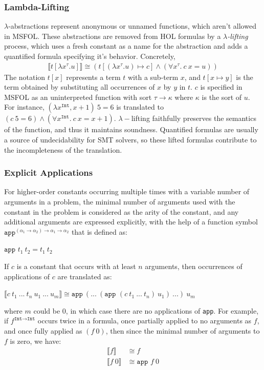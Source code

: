 \documentclass[11pt]{article}
\begin{document}
	\subsubsection{Lambda-Lifting}
	$\lambda$-abstractions represent 
	anonymous or unnamed functions, 
	which aren't allowed in MSFOL.
	These abstractions are removed
	from HOL formulas by a 
	\textit{$\lambda$-lifting} process,
	which uses a fresh constant as a
	name for the abstraction and adds 
	a quantified formula specifying 
	it's behavior. Concretely,
	\begin{align*}
	\llbracket t[\lambda x^{\tau}.u]
	\rrbracket \cong 
	(t[(\lambda x^{\tau}.u) \mapsto c]
	\land (\forall x^{\tau}.\ c\ x = u))
	\end{align*}
	The notation $t[x]$ represents a 
	term $t$ with a sub-term $x$, 
	and $t[x \mapsto y]$ is the 
	term obtained by substituting all 
	occurrences of $x$ by $y$ in $t$.
	$c$ is specified in MSFOL as an 
	uninterpreted function with sort 
	$\tau \to \kappa$ where $\kappa$ 
	is the sort of $u$. For instance, 
	$(\lambda x^{\texttt{Int}}, x + 1)\ 
	5 = 6$
	is translated to $(c\ 5 = 6) \land
	(\forall x^{\texttt{Int}}.\ 
	c\ x = x + 1)$. $\lambda-$lifting
	faithfully preserves the 
	semantics of the function, and 
	thus it maintains soundness. 
	Quantified formulas are usually a 
	source of undecidability for SMT 
	solvers, so these lifted formulas 
	contribute to the incompleteness
	of the translation.
	
	\subsubsection{Explicit Applications}
	For higher-order constants 
	occurring multiple times with 
	a variable number 
	of arguments in a problem, 
	the minimal number of arguments 
	used with the constant in the 
	problem is considered as the arity 
	of the constant, and any additional 
	arguments are expressed 
	explicitly, with the help of a 
	function symbol 
	$\texttt{app}^{(\alpha_1 \to 
		\alpha_2) \to \alpha_1 \to 
		\alpha_2}$ that is defined as:
	\begin{center}
		$\texttt{app }t_1\ t_2 = 
		t_1\ t_2$
	\end{center}
	If $c$ is a constant that 
	occurs with at least $n$
	arguments, then 
	occurrences of applications 
	of $c$ are translated as:
	\begin{center}
		$\llbracket c\ t_1\ ...\ t_n
		\ u_1\ ...\ u_m \rrbracket
		\cong \texttt{app}\ (...\ 
		(\texttt{app }(c\ t_1\ 
		...\ t_n)\ u_1)	\ ...)\ u_m$
	\end{center}
	where $m$ could be $0$, in which 
	case there are no applications 
	of \texttt{app}. For example, if 
	$f^{\texttt{Int} \to \texttt{Int}}$ 
	occurs twice in a formula, once 
	partially applied to no arguments 
	as $f$, and once fully applied as 
	$(f\ 0)$, then since the minimal 
	number of arguments to $f$ is 
	zero, we have:
	\begin{align*}
	\llbracket f \rrbracket &\cong
	f\\
	\llbracket f\ 0 \rrbracket &\cong
	\texttt{app } f\ 0
	\end{align*}
	
\end{document}

